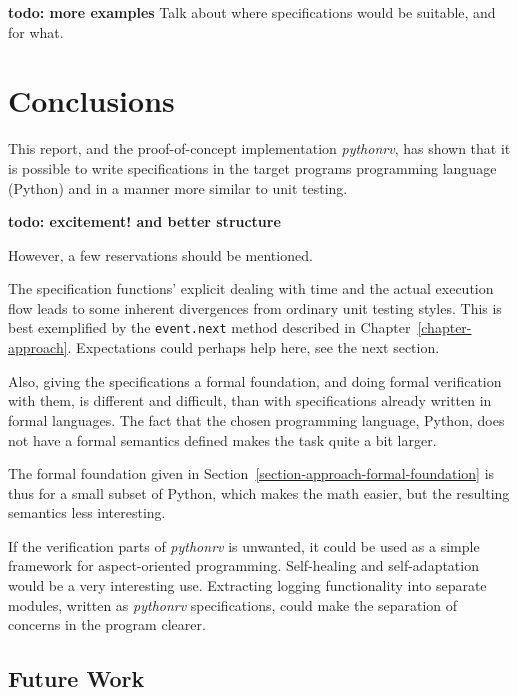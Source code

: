 \documentclass[a4paper,11pt]{kth-mag}
\newcommand{\todo}[1]{\textbf{todo: #1}}
\begin{document}
\todo{more examples}
Talk about where specifications would be suitable, and for what.






\pagestyle{newchap}
\chapter{Conclusions} \label{chapter-conclusions}

This report, and the proof-of-concept implementation \textit{pythonrv}, has
shown that it is possible to write specifications in the target programs
programming language (Python) and in a manner more similar to unit testing.

\todo{excitement! and better structure}

However, a few reservations should be mentioned.

The specification functions' explicit dealing with time and the actual
execution flow leads to some inherent divergences from ordinary unit testing
styles. This is best exemplified by the \texttt{event.next} method described in
Chapter~\ref{chapter-approach}. Expectations could perhaps help here, see the
next section.

Also, giving the specifications a formal foundation, and doing formal
verification with them, is different and difficult, than with specifications
already written in formal languages. The fact that the chosen programming
language, Python, does not have a formal semantics defined makes the task quite
a bit larger.

The formal foundation given in Section~\ref{section-approach-formal-foundation}
is thus for a small subset of Python, which makes the math easier, but the
resulting semantics less interesting.

If the verification parts of \textit{pythonrv} is unwanted, it could be used as
a simple framework for aspect-oriented programming. Self-healing and
self-adaptation would be a very interesting use. Extracting logging
functionality into separate modules, written as \textit{pythonrv}
specifications, could make the separation of concerns in the program clearer.


\section{Future Work}
\end{document}
